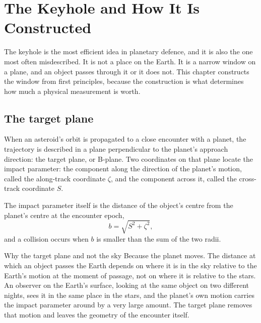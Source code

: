 
\chapter{The Keyhole and How It Is Constructed}
\label{ch:keyhole}

The keyhole is the most efficient idea in planetary defence, and it is also
the one most often misdescribed. It is not a place on the Earth. It is a
narrow window on a plane, and an object passes through it or it does not.
This chapter constructs the window from first principles, because the
construction is what determines how much a physical measurement is worth.

\section{The target plane}

When an asteroid's orbit is propagated to a close encounter with a planet, the
trajectory is described in a plane perpendicular to the planet's approach
direction: the target plane, or B-plane. Two coordinates on that plane locate
the impact parameter: the component along the direction of the planet's
motion, called the along-track coordinate \(\zeta\), and the component across
it, called the cross-track coordinate \(S\).

The impact parameter itself is the distance of the object's centre from the
planet's centre at the encounter epoch,
\begin{equation}
b = \sqrt{S^{2} + \zeta^{2}},
\label{eq:bplane}
\end{equation}
and a collision occurs when \(b\) is smaller than the sum of the two radii.

\begin{deeper}{Why the target plane and not the sky}
Because the planet moves. The distance at which an object passes the Earth
depends on where it is in the sky relative to the Earth's motion at the
moment of passage, not on where it is relative to the stars. An observer on
the Earth's surface, looking at the same object on two different nights, sees
it in the same place in the stars, and the planet's own motion carries the
impact parameter around by a very large amount. The target plane removes
that motion and leaves the geometry of the encounter itself.
\end{deeper}

